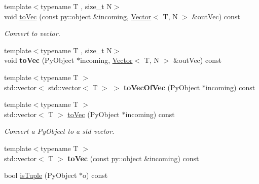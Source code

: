 \begin{Indent}
\begin{DoxyCompactItemize}
{\footnotesize template$<$typename T , size\+\_\+t N$>$ }\\void \mbox{\hyperlink{classrev_1_1_python_a_p_i_abe3cecdfd0693a0263efd4464caa668f}{to\+Vec}} (const py\+::object \&incoming, \mbox{\hyperlink{classrev_1_1_vector}{Vector}}$<$ T, N $>$ \&out\+Vec) const
\begin{DoxyCompactList}\small\item\em Convert to vector. \end{DoxyCompactList}\item 
\mbox{\label{classrev_1_1_python_a_p_i_a4adf04c19934a0e460ba3f07604d32d4}} 
{\footnotesize template$<$typename T , size\+\_\+t N$>$ }\\void {\bfseries to\+Vec} (Py\+Object $\ast$incoming, \mbox{\hyperlink{classrev_1_1_vector}{Vector}}$<$ T, N $>$ \&out\+Vec) const
\item 
\mbox{\label{classrev_1_1_python_a_p_i_a58814e5b51fbf63751c0d38f3c58d65a}} 
{\footnotesize template$<$typename T $>$ }\\std\+::vector$<$ std\+::vector$<$ T $>$ $>$ {\bfseries to\+Vec\+Of\+Vec} (Py\+Object $\ast$incoming) const
\item 
\mbox{\label{classrev_1_1_python_a_p_i_a7fe313eb525dfd90e882bd0b162c1b97}} 
{\footnotesize template$<$typename T $>$ }\\std\+::vector$<$ T $>$ \mbox{\hyperlink{classrev_1_1_python_a_p_i_a7fe313eb525dfd90e882bd0b162c1b97}{to\+Vec}} (Py\+Object $\ast$incoming) const
\begin{DoxyCompactList}\small\item\em Convert a Py\+Object to a std vector. \end{DoxyCompactList}\item 
\mbox{\label{classrev_1_1_python_a_p_i_ac347c100013cc94ab5481b4262467eb3}} 
{\footnotesize template$<$typename T $>$ }\\std\+::vector$<$ T $>$ {\bfseries to\+Vec} (const py\+::object \&incoming) const
\item 
\mbox{\label{classrev_1_1_python_a_p_i_acf94a7f9f711c9d2c7fabc24958e376d}} 
bool \mbox{\hyperlink{classrev_1_1_python_a_p_i_acf94a7f9f711c9d2c7fabc24958e376d}{is\+Tuple}} (Py\+Object $\ast$o) const

\end{DoxyCompactItemize}
\end{Indent}
